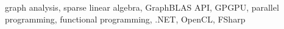 \documentclass[conference]{IEEEtran}
\begin{document}
\begin{IEEEkeywords}
graph analysis, sparse linear algebra, GraphBLAS API, GPGPU, parallel programming, functional programming, .NET, OpenCL, FSharp
\end{IEEEkeywords}



%

%



%




\end{document}
